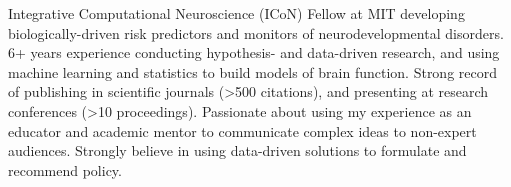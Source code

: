 

\begin{cvparagraph}

Integrative Computational Neuroscience (ICoN) Fellow at MIT developing biologically-driven risk predictors and monitors of neurodevelopmental disorders. 6+ years experience conducting hypothesis- and data-driven research, and using machine learning and statistics to build models of brain function. Strong record of publishing in scientific journals (>500 citations), and presenting at research conferences (>10 proceedings). Passionate about using my experience as an educator and academic mentor to communicate complex ideas to non-expert audiences. Strongly believe in using data-driven solutions to formulate and recommend policy.

\end{cvparagraph}
